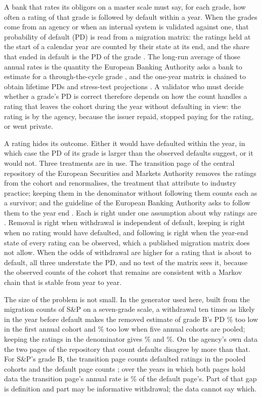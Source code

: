 A bank that rates its obligors on a master scale must say, for each grade, how often a rating of that grade is followed by default within a year. When the grades come from an agency or when an internal system is validated against one, that probability of default (PD) is read from a migration matrix: the ratings held at the start of a calendar year are counted by their state at its end, and the share that ended in default is the PD of the grade \citep{anderson1957,jarrow1997,israel2001,jafry2004}. The long-run average of those annual rates is the quantity the European Banking Authority asks a bank to estimate for a through-the-cycle grade \citep{eba2017}, and the one-year matrix is chained to obtain lifetime PDs and stress-test projections \citep{engelmann2024}. A validator who must decide whether a grade's PD is correct therefore depends on how the count handles a rating that leaves the cohort during the year without defaulting in view: the rating is \wdn{} by the agency, because the issuer repaid, stopped paying for the rating, or went private.

A \wdn{} rating hides its outcome. Either it would have defaulted within the year, in which case the PD of its grade is larger than the observed defaults suggest, or it would not. Three treatments are in use. The transition page of the central repository of the European Securities and Markets Authority removes the \wdn{} ratings from the cohort and renormalises, the treatment that \citet{schuermann2004} attribute to industry practice; keeping them in the denominator without following them counts each as a survivor; and the guideline of the European Banking Authority asks to follow them to the year end \citep{eba2017}. Each is right under one assumption about why ratings are \wdn{}. Removal is right when withdrawal is independent of default, keeping is right when no \wdn{} rating would have defaulted, and following is right when the year-end state of every \wdn{} rating can be observed, which a published migration matrix does not allow. When the odds of withdrawal are higher for a rating that is about to default, all three understate the PD, and no test of the matrix sees it, because the observed counts of the cohort that remains are consistent with a Markov chain that is stable from year to year.

The size of the problem is not small. In the generator used here, built from the migration counts of S\&P on a seven-grade scale, a withdrawal ten times as likely in the year before default makes the removed estimate of grade B's PD \% too low in the first annual cohort and \% too low when five annual cohorts are pooled; keeping the \wdn{} ratings in the denominator gives \% and \%. On the agency's own data the two pages of the repository that count defaults disagree by more than that. For S\&P's grade B, the transition page counts  defaulted ratings in the pooled cohorts and the default page counts ; over the years in which both pages hold data the transition page's annual rate is \% of the default page's. Part of that gap is definition and part may be informative withdrawal; the data cannot say which.


